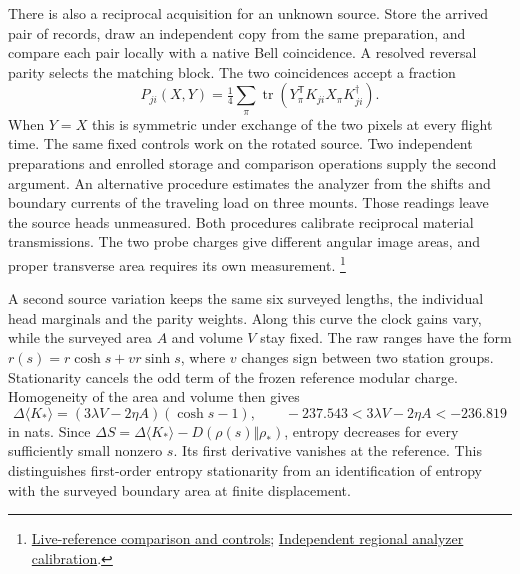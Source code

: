 \documentclass[11pt]{article}
\begin{document}
There is also a reciprocal acquisition for an unknown source.
Store the arrived pair of records, draw an independent copy from the
same preparation, and compare each pair locally with a native Bell
coincidence. A resolved reversal parity selects the matching block.
The two coincidences accept a fraction
\[
 P_{ji}(X,Y)=\tfrac14\sum_\pi
   \operatorname{tr}(Y_\pi^{\mathsf T} K_{ji} X_\pi K_{ji}^\dagger).
\]
When $Y=X$ this is symmetric under exchange of the two pixels at every
flight time. The same fixed controls work on the rotated source. Two
independent preparations and enrolled storage and comparison operations
supply the second argument. An alternative procedure estimates the
analyzer from the shifts and boundary currents of the traveling load
on three mounts. Those readings leave the source heads unmeasured.
Both procedures calibrate reciprocal material transmissions. The two
probe charges give different angular image areas, and proper
transverse area requires its own measurement.%
\footnote{\href{https://github.com/FloatingPragma/observer-patch-holography/tree/main/code/matched_einstein_limit/source_implication/full_geometry/station_balls/reciprocal_screen/live_reference}{Live-reference comparison and controls};
\href{https://github.com/FloatingPragma/observer-patch-holography/tree/main/code/matched_einstein_limit/source_implication/full_algebra/correlation_rank/spatial_cuts/chart_transport/adaptive_optics}{Independent regional analyzer calibration}.}

A second source variation keeps the same six surveyed lengths, the
individual head marginals and the parity weights. Along this curve the
clock gains vary, while the surveyed area $A$ and volume $V$ stay fixed.
The raw ranges have the form $r(s)=r\cosh s+v r\sinh s$, where $v$
changes sign between two station groups. Stationarity cancels the odd
term of the frozen reference modular charge. Homogeneity of the area
and volume then gives
\[
 \Delta\langle K_*\rangle=(3\lambda V-2\eta A)(\cosh s-1),\qquad
 -237.543<3\lambda V-2\eta A<-236.819
\]
in nats. Since
$\Delta S=\Delta\langle K_*\rangle-D(\rho(s)\Vert\rho_*)$, entropy
decreases for every sufficiently small nonzero $s$. Its first
derivative vanishes at the reference. This distinguishes first-order
entropy stationarity from an identification of entropy with the
surveyed boundary area at finite displacement.
\end{document}

